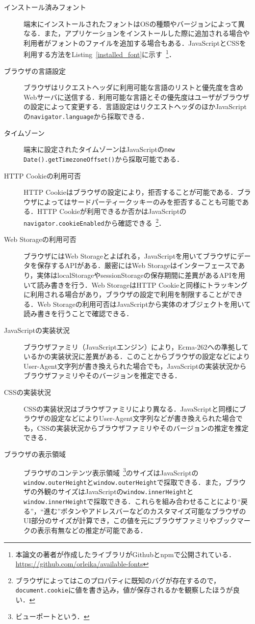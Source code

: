 \begin{description}
  \item[インストール済みフォント]端末にインストールされたフォントはOSの種類やバージョンによって異なる．また，アプリケーションをインストールした際に追加される場合や利用者がフォントのファイルを追加する場合もある．JavaScriptとCSSを利用する方法をListing~\ref{installed_font}に示す~\footnote{本論文の著者が作成したライブラリがGithubとnpmで公開されている．\url{https://github.com/orleika/available-fonts}}．

\item[ブラウザの言語設定]ブラウザはリクエストヘッダに利用可能な言語のリストと優先度を含めWebサーバに送信する．利用可能な言語とその優先度はユーザがブラウザの設定によって変更する．言語設定はリクエストヘッダのほかJavaScriptの\texttt{navigator.language}から採取できる．
\item[タイムゾーン]端末に設定されたタイムゾーンはJavaScriptの\texttt{new Date().getTimezoneOffset()}から採取可能である．
\item[HTTP Cookieの利用可否]HTTP Cookieはブラウザの設定により，拒否することが可能である．ブラウザによってはサードパーティークッキーのみを拒否することも可能である．HTTP Cookieが利用できるか否かはJavaScriptの\texttt{navigator.cookieEnabled}から確認できる~\footnote{ブラウザによってはこのプロパティに既知のバグが存在するので，\texttt{document.cookie}に値を書き込み，値が保存されるかを観察したほうが良い．}．
\item[Web Storageの利用可否]ブラウザにはWeb Storageとよばれる，JavaScriptを用いてブラウザにデータを保存するAPIがある．厳密にはWeb Storageはインターフェースであり，実体はlocalStorageやsessionStorageの保存期間に差異があるAPIを用いて読み書きを行う．Web StorageはHTTP Cookieと同様にトラッキングに利用される場合があり，ブラウザの設定で利用を制限することができる．Web Storageの利用可否はJavaScriptから実体のオブジェクトを用いて読み書きを行うことで確認できる．
\item[JavaScriptの実装状況]ブラウザファミリ（JavaScriptエンジン）により，Ecma-262への準拠しているかの実装状況に差異がある．このことからブラウザの設定などによりUser-Agent文字列が書き換えられた場合でも，JavaScriptの実装状況からブラウザファミリやそのバージョンを推定できる．
\item[CSSの実装状況]CSSの実装状況はブラウザファミリにより異なる．JavaScriptと同様にブラウザの設定などによりUser-Agent文字列などが書き換えられた場合でも，CSSの実装状況からブラウザファミリやそのバージョンの推定を推定できる．
\item[ブラウザの表示領域]ブラウザのコンテンツ表示領域~\footnote{ビューポートという．}のサイズはJavaScriptの\texttt{window.outerHeight}と\texttt{window.outerHeight}で採取できる．また，ブラウザの外観のサイズはJavaScriptの\texttt{window.innerHeight}と\texttt{window.innerHeight}で採取できる．これらを組み合わせることにより``戻る''，``進む''ボタンやアドレスバーなどのカスタマイズ可能なブラウザのUI部分のサイズが計算でき，この値を元にブラウザファミリやブックマークの表示有無などの推定が可能である．

\end{description}
